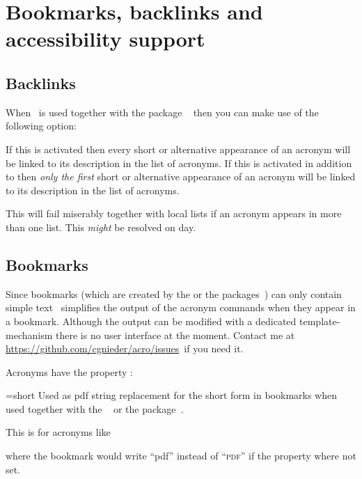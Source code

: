 \documentclass{acro-manual}
\newcommand*\issues{\url{https://github.com/cgnieder/acro/issues}}
\begin{document}
\section{Bookmarks, backlinks and accessibility support}\label{sec:pdf-properties}
\subsection{Backlinks}\label{sec:backlinks}
When \acro\ is used together with the package
~\cite{pkg:hyperref} then you can make use of the following
option:
\begin{options}
    If this is activated then every short or alternative appearance of an
    acronym will be linked to its description in the list of acronyms.
    If this is activated in addition to 
    then \emph{only the first} short or alternative appearance of an acronym
    will be linked to its description in the list of acronyms.
\end{options}
\begin{bewareofthedog}
  This will fail miserably together with local lists if an acronym appears in
  more than one list.  This \emph{might} be resolved on day.
\end{bewareofthedog}

\subsection{Bookmarks}\label{sec:bookmarks}
Since bookmarks (which are created by the  or the 
packages~\cite{pkg:bookmark}) can only contain simple text \acro\ simplifies
the output of the acronym commands when they appear in a bookmark.  Although
the output can be modified with a dedicated template-mechanism there is no
user interface at the moment.  Contact me at \issues\ if you need it.

Acronyms have the property :
\begin{properties}
  \Default={short}
    Used as \acs{pdf} string replacement for the short form in bookmarks when
    used together with the ~\cite{pkg:hyperref} or the
     package~\cite{pkg:bookmark}.
\end{properties}

This is for acronyms like
\begin{sourcecode}
\end{sourcecode}
where the bookmark would write \enquote{pdf} instead of \enquote{\textsc{pdf}}
if the property where not set.
\end{document}
